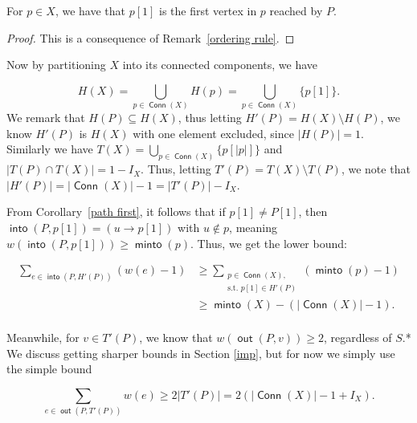 \documentclass{article}
\DeclareMathOperator{\minto}{\bm{\mathsf{minto}}}
\DeclareMathOperator{\out}{\bm{\mathsf{out}}}
\DeclareMathOperator{\into}{\bm{\mathsf{into}}}
\DeclareMathOperator{\Conn}{\bm{\mathsf{Conn}}}
\newcommand{\edit}[1]{}%
\newcommand{\dc}[1]{}%
\newcommand{\zh}[1]{}%
\begin{document}
\vspace{1.75em}

\begin{cor}\label{path first} For $p \in X$, we have that $p[1]$ is the first vertex in $p$ reached by $P$. \begin{proof}This is a consequence of Remark~\ref{ordering rule}.\end{proof}\end{cor}

\vspace{1.75em}

Now by partitioning $X$ into its connected components, we have

\[H(X) = \bigcup_{p \in \Conn(X)} H(p) = \bigcup_{p \in \Conn(X)} \{p[1]\}.\]\edit{could try to better convey that this is true for any graph, and is not specific to $X$ }We remark that $H(P) \subseteq H(X)$, thus letting $H'(P) = H(X)\setminus H(P)$, we know $H'(P)$ is $H(X)$ with one element excluded, since $|H(P)| = 1$. Similarly we have $T(X) = \bigcup_{p \in \Conn(X)} \{p[|p|]\}$ and $|T(P) \cap T(X)| = 1-I_X$. Thus, letting $T'(P) = T(X)\setminus T(P)$, we note that $|H'(P)| = |\Conn(X)|-1 = |T'(P)|-I_X$.

From Corollary~\ref{path first}, it follows that if $p[1] \neq P[1]$, then $\into(P,p[1]) = (u \to p[1])$ with $u \not \in p$, meaning $w(\into(P,p[1])) \geq \minto(p)$. Thus, we get the lower bound:

\begin{align*}
    \sum_{e \in \into(P,H'(P))} (w(e)-1) &\geq \sum_{\substack{p \in \Conn(X),\\ \text{s.t. } p[1] \in H'(P)}}(\minto(p)-1)\\
    &\geq \minto(X) - (|\Conn(X)|-1).\\
\end{align*}
\dc{minto defined for graphs is a bit weird to me. I think it would be fine if (a) you made this two lines, so $LHS\le$[something with a sum][newline]$=$[something with minto] or (b) don't define minto for graphs and just use sums everywhere.}

Meanwhile, for $v \in T'(P)$, we know that $w(\out(P,v)) \geq 2$, regardless of $S$\dc{ do you even need to say ``regardless of $S$,'' since you have an explicit $S$ you are using?}\zh{ I like to generalize if it doesn't really cost more effort}.*\dc{ make footnote or merge into body} We discuss getting sharper bounds in Section \ref{imp}, but for now we simply use the simple bound

\[\sum_{e \in \out(P,T'(P))} w(e) \geq 2|T'(P)| = 2(|\Conn(X)|-1+I_X). \]
\end{document}
